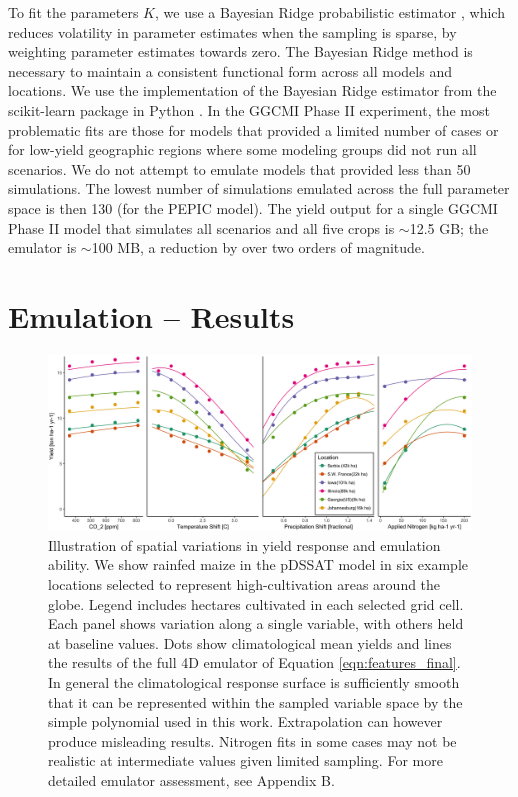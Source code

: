 \documentclass[esd, manuscript]{copernicus} %
\begin{document}
To fit the parameters $K$, we use a Bayesian Ridge probabilistic estimator \citep{MacKay91}, which reduces volatility in parameter estimates when the sampling is sparse, by weighting parameter estimates towards zero. The Bayesian Ridge method is necessary to maintain a consistent functional form across all models and locations. We use the implementation of the Bayesian Ridge estimator from the scikit-learn package in Python \citep{scikit-learn}. In the GGCMI Phase II experiment, the most problematic fits are those for models that provided a limited number of cases or for low-yield geographic regions where some modeling groups did not run all scenarios. We do not attempt to emulate models that provided less than 50 simulations. The lowest number of simulations emulated across the full parameter space is then 130 (for the PEPIC model). The yield output for a single GGCMI Phase II model that simulates all scenarios and all five crops is $\sim$12.5 GB; the emulator is $\sim$100 MB, a reduction by over two orders of magnitude. 

\section{Emulation -- Results}
\label{S:5}

\begin{figure}[ht]
\centering
    \includegraphics[width=16cm]{figures/regression_areas.png}
    \caption{Illustration of spatial variations in yield response and emulation ability. We show rainfed maize in the pDSSAT model in six example locations selected to represent high-cultivation areas around the globe. Legend includes hectares cultivated in each selected grid cell. Each panel shows variation along a single variable, with others held at baseline values. Dots show climatological mean yields and lines the results of the full 4D emulator of Equation \ref{eqn:features_final}. In general the climatological response surface is sufficiently smooth that it can be represented within the sampled variable space by the simple polynomial used in this work. Extrapolation can however produce misleading results. Nitrogen fits in some cases may not be realistic at intermediate values given limited sampling. For more detailed emulator assessment, see Appendix B.}
   \label{fig:regression}
\end{figure}
\end{document}
